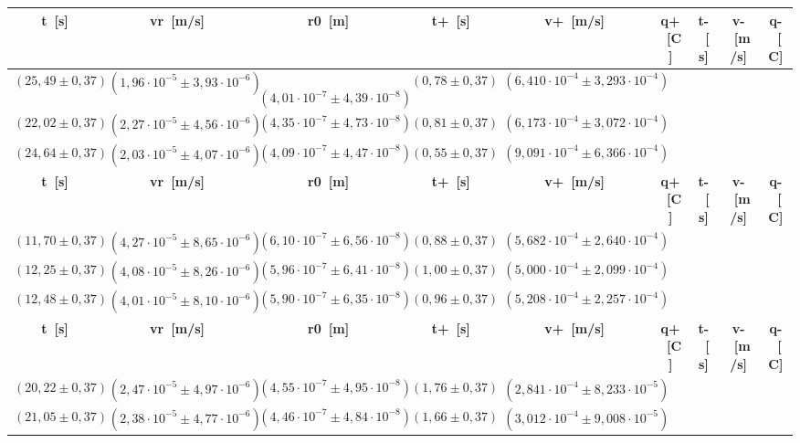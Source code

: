 \documentclass{article}
\begin{document}
\begin{table}[H]
\begin{flushleft}
\begin{tabular}{|c|c|c|c|c|c|c|c|c|}
        \toprule
        \textbf{t~[s]} & \textbf{vr~[m/s]} & \textbf{r0~[m]} & \textbf{t+~[s]} & \textbf{v+~[m/s]} & \textbf{q+~[C]} & \textbf{t-~[s]} & \textbf{v-~[m/s]} & \textbf{q-~[C]} \\
        \midrule
        \((25,49 \pm 0,37)\) & \((1,96 \cdot 10^{-5} \pm 3,93 \cdot 10^{-6})\) & \ \((4,01 \cdot 10^{-7} \pm 4,39 \cdot 10^{-8})\) & \((0,78 \pm 0,37)\) & \((6,410 \cdot 10^{-4} \pm 3,293 \cdot 10^{-4})\) \\
        \((22,02 \pm 0,37)\) & \((2,27 \cdot 10^{-5} \pm 4,56 \cdot 10^{-6})\) & \((4,35 \cdot 10^{-7} \pm 4,73 \cdot 10^{-8})\) & \((0,81 \pm 0,37)\) & \((6,173 \cdot 10^{-4} \pm 3,072 \cdot 10^{-4})\) \\
        \((24,64 \pm 0,37)\) & \((2,03 \cdot 10^{-5} \pm 4,07 \cdot 10^{-6})\) & \((4,09 \cdot 10^{-7} \pm 4,47 \cdot 10^{-8})\) & \((0,55 \pm 0,37)\) & \((9,091 \cdot 10^{-4} \pm 6,366 \cdot 10^{-4})\) \\
        \toprule
        \textbf{t~[s]} & \textbf{vr~[m/s]} & \textbf{r0~[m]} & \textbf{t+~[s]} & \textbf{v+~[m/s]} & \textbf{q+~[C]} & \textbf{t-~[s]} & \textbf{v-~[m/s]} & \textbf{q-~[C]} \\
        \midrule
        \((11,70 \pm 0,37)\) & \((4,27 \cdot 10^{-5} \pm 8,65 \cdot 10^{-6})\) & \((6,10 \cdot 10^{-7} \pm 6,56 \cdot 10^{-8})\) & \((0,88 \pm 0,37)\) & \((5,682 \cdot 10^{-4} \pm 2,640 \cdot 10^{-4})\) \\
        \((12,25 \pm 0,37)\) & \((4,08 \cdot 10^{-5} \pm 8,26 \cdot 10^{-6})\) & \((5,96 \cdot 10^{-7} \pm 6,41 \cdot 10^{-8})\) & \((1,00 \pm 0,37)\) & \((5,000 \cdot 10^{-4} \pm 2,099 \cdot 10^{-4})\) \\
        \((12,48 \pm 0,37)\) & \((4,01 \cdot 10^{-5} \pm 8,10 \cdot 10^{-6})\) & \((5,90 \cdot 10^{-7} \pm 6,35 \cdot 10^{-8})\) & \((0,96 \pm 0,37)\) & \((5,208 \cdot 10^{-4} \pm 2,257 \cdot 10^{-4})\) \\
        \toprule
        \textbf{t~[s]} & \textbf{vr~[m/s]} & \textbf{r0~[m]} & \textbf{t+~[s]} & \textbf{v+~[m/s]} & \textbf{q+~[C]} & \textbf{t-~[s]} & \textbf{v-~[m/s]} & \textbf{q-~[C]} \\
        \midrule
        \((20,22 \pm 0,37)\) & \((2,47 \cdot 10^{-5} \pm 4,97 \cdot 10^{-6})\) & \((4,55 \cdot 10^{-7} \pm 4,95 \cdot 10^{-8})\) & \((1,76 \pm 0,37)\) & \((2,841 \cdot 10^{-4} \pm 8,233 \cdot 10^{-5})\) \\
        \((21,05 \pm 0,37)\) & \((2,38 \cdot 10^{-5} \pm 4,77 \cdot 10^{-6})\) & \((4,46 \cdot 10^{-7} \pm 4,84 \cdot 10^{-8})\) & \((1,66 \pm 0,37)\) & \((3,012 \cdot 10^{-4} \pm 9,008 \cdot 10^{-5})\) \\

\end{tabular}
\end{flushleft}
\end{table}
\end{document}
